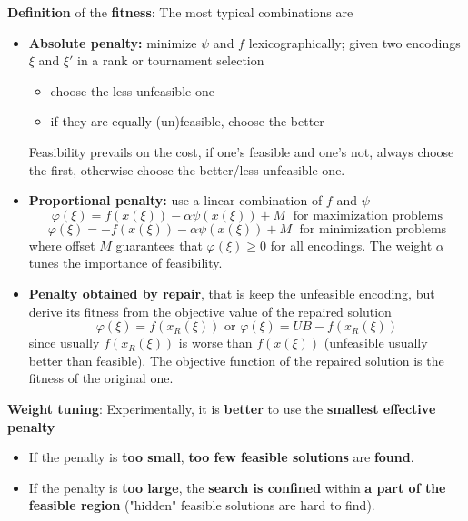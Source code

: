 \textbf{Definition} of the \textbf{fitness}: The most typical combinations are
\begin{itemize}
	\item \textbf{Absolute penalty:} minimize $\psi$ and $f$ lexicographically; given two encodings $\xi$ and $\xi'$ in a rank or tournament selection
	\begin{itemize}
		\item choose the less unfeasible one
		\item if they are equally (un)feasible, choose the better
	\end{itemize}
	Feasibility prevails on the cost, if one's feasible and one's not, always choose the first, otherwise choose the better/less unfeasible one.\\
	
	\item \textbf{Proportional penalty:} use a linear combination of $f$ and $\psi$
	$$ \varphi (\xi) = f (x (\xi)) - \alpha \psi (x (\xi)) + M \; \text{ for maximization problems} $$
	$$ \varphi (\xi) = -f (x (\xi)) - \alpha \psi (x (\xi)) + M \; \text{ for minimization problems} $$
	where offset $M$ guarantees that $\varphi (\xi) \geq 0$ for all encodings. The weight $\alpha$ tunes the importance of feasibility.\\
	
	\item \textbf{Penalty obtained by repair}, that is keep the unfeasible encoding, but derive its fitness from the objective value of the repaired solution
	$$ \varphi (\xi) = f (x_R (\xi)) \text{ or } \varphi (\xi) = UB - f (x_R (\xi)) $$
	since usually $f (x_R (\xi))$ is worse than $f (x (\xi))$ (unfeasible usually better than feasible). The objective function of the repaired solution is the fitness of the original one.\\
\end{itemize}

\newpage

\textbf{Weight tuning}: Experimentally, it is \textbf{better} to use the \textbf{smallest effective penalty}
\begin{itemize}
	\item If the penalty is \textbf{too small}, \textbf{too few feasible solutions} are \textbf{found}.\\
	
	\item If the penalty is \textbf{too large}, the \textbf{search is confined} within \textbf{a part of the feasible region} ("hidden" feasible solutions are hard to find).\\
\end{itemize}


